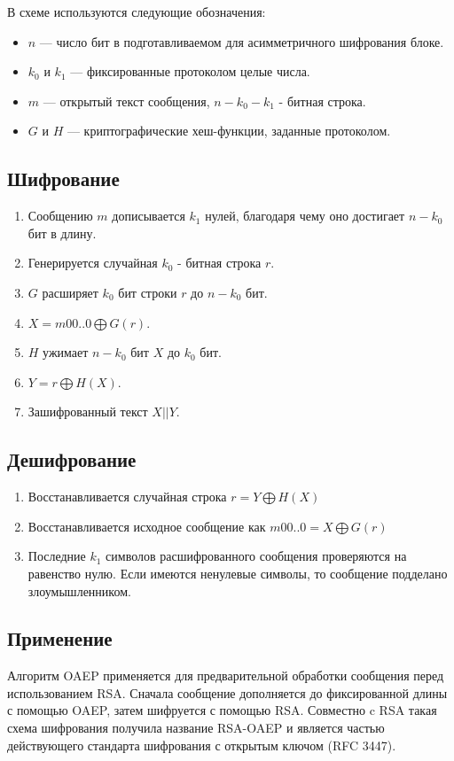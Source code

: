 \documentclass[12pt,a4paper]{scrartcl}
\begin{document}
	В схеме используются следующие обозначения:
	
	\begin{itemize}
		\item $n$ — число бит в подготавливаемом для асимметричного шифрования блоке.
		\item $k_{0}$ и $k_{1}$ — фиксированные протоколом целые числа.
		\item $m$ — открытый текст сообщения, $n-k_{0}-k_{1}$ - битная строка.
		\item $G$ и $H$ — криптографические хеш-функции, заданные протоколом.
	\end{itemize}
	
	\subsection{Шифрование}
	
	\begin{enumerate}
		\item Сообщению $m$ дописывается $k_{1}$ нулей, благодаря чему оно достигает $n-k_{0}$ бит в длину.
		\item Генерируется случайная $k_{0}$ - битная строка $r$.
		\item $G$ расширяет $k_{0}$ бит строки $r$ до $n-k_{0}$ бит.
		\item $X=m00..0\bigoplus G(r)$.
		\item $H$ ужимает $n-k_{0}$ бит $X$ до $k_{0}$ бит.
		\item $Y=r\bigoplus H(X)$.
		\item Зашифрованный текст $X||Y$.
	\end{enumerate}
	
	\subsection{Дешифрование}
	
	\begin{enumerate}
		\item Восстанавливается случайная строка $r=Y\bigoplus H(X)$
		\item Восстанавливается исходное сообщение как $m00..0=X\bigoplus G(r)$
		\item Последние $k_{1}$ символов расшифрованного сообщения проверяются на равенство нулю. Если имеются ненулевые символы, то сообщение подделано злоумышленником.
	\end{enumerate}
	
	\subsection{Применение}
	Алгоритм OAEP применяется для предварительной обработки сообщения перед использованием RSA. Сначала сообщение дополняется до фиксированной длины с помощью OAEP, затем шифруется с помощью RSA. Совместно c RSA такая схема шифрования получила название RSA-OAEP и является частью действующего стандарта шифрования с открытым ключом (RFC 3447).\\
	
\end{document}
